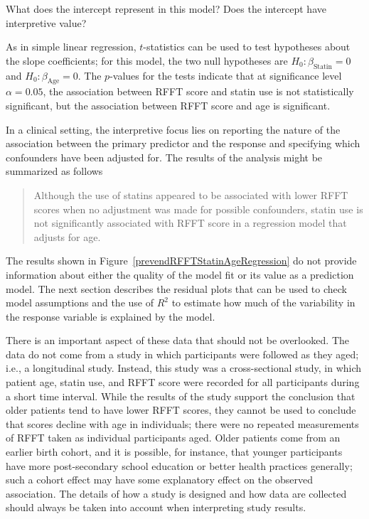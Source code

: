 \textD{\newpage}

\begin{exercisewrap}
\begin{nexercise}
What does the intercept represent in this model? Does the intercept have interpretive value?\footnotemark{}
\end{nexercise}
\end{exercisewrap}

As in simple linear regression, $t$-statistics can be used to test hypotheses about the slope coefficients; for this model, the two null hypotheses are $H_0: \beta_{\text{Statin}} = 0$ and $H_0: \beta_{\text{Age}} = 0$. The $p$-values for the tests indicate that at significance level $\alpha = 0.05$, the association between RFFT score and statin use is not statistically significant, but the association between RFFT score and age is significant. 

In a clinical setting, the interpretive focus lies on reporting the nature of the association between the primary predictor and the response and specifying which confounders have been adjusted for. The results of the analysis might be summarized as follows\textemdash
\begin{quotation}
	Although the use of statins appeared to be associated with lower RFFT scores when no adjustment was made for possible confounders, statin use is not significantly associated with RFFT score in a regression model that adjusts for age. 
\end{quotation}

The results shown in Figure~\ref{prevendRFFTStatinAgeRegression} do not provide information about either the quality of the model fit or its value as a prediction model. The next section describes the residual plots that can be used to check model assumptions and the use of $R^2$ to estimate how much of the variability in the response variable is explained by the model.

There is an important aspect of these data that should not be overlooked. The data do not come from a study in which participants were followed as they aged; i.e., a longitudinal study. Instead, this study was a cross-sectional study, in which patient age, statin use, and RFFT score were recorded for all participants during a short time interval. While the results of the study support the conclusion that older patients tend to have lower RFFT scores, they cannot be used to conclude that scores decline with age in individuals; there were no repeated measurements of RFFT taken as individual participants aged. Older patients come from an earlier birth cohort, and it is possible, for instance, that younger participants have more post-secondary school education or better health practices generally; such a cohort effect may have some explanatory effect on the observed association. The details of how a study is designed and how data are collected should always be taken into account when interpreting study results. 

